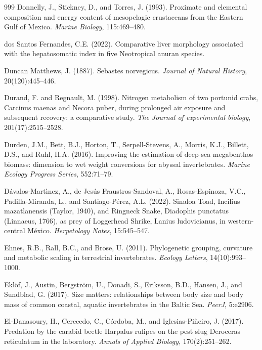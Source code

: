 \begin{thebibliography}{999}
Donnelly, J., Stickney, D., and Torres, J. (1993). Proximate and elemental composition and energy content of mesopelagic crustaceans from the Eastern Gulf of Mexico. \textit{Marine Biology}, 115:469--480.

dos Santos Fernandes, C.E. (2022). Comparative liver morphology associated with the hepatosomatic index in five Neotropical anuran species.

Duncan Matthews, J. (1887). Sebastes norvegicus. \textit{Journal of Natural History}, 20(120):445--446.

Durand, F. and Regnault, M. (1998). Nitrogen metabolism of two portunid crabs, Carcinus maenas and Necora puber, during prolonged air exposure and subsequent recovery: a comparative study. \textit{The Journal of experimental biology}, 201(17):2515--2528.

Durden, J.M., Bett, B.J., Horton, T., Serpell-Stevens, A., Morris, K.J., Billett, D.S., and Ruhl, H.A. (2016). Improving the estimation of deep-sea megabenthos biomass: dimension to wet weight conversions for abyssal invertebrates. \textit{Marine Ecology Progress Series}, 552:71--79.

D{\'a}valos-Mart{\'\i}nez, A., de Jes{\'u}s Fraustros-Sandoval, A., Rosas-Espinoza, V.C., Padilla-Miranda, L., and Santiago-P{\'e}rez, A.L. (2022). Sinaloa Toad, Incilius mazatlanensis (Taylor, 1940), and Ringneck Snake, Diadophis punctatus (Linnaeus, 1766), as prey of Loggerhead Shrike, Lanius ludovicianus, in western-central M{\'e}xico. \textit{Herpetology Notes}, 15:545--547.

Ehnes, R.B., Rall, B.C., and Brose, U. (2011). Phylogenetic grouping, curvature and metabolic scaling in terrestrial invertebrates. \textit{Ecology Letters}, 14(10):993--1000.

Ekl{\"o}f, J., Austin, Bergstr{\"o}m, U., Donadi, S., Eriksson, B.D., Hansen, J., and Sundblad, G. (2017). Size matters: relationships between body size and body mass of common coastal, aquatic invertebrates in the Baltic Sea. \textit{PeerJ}, 5:e2906.

El-Danasoury, H., Cerecedo, C., C{\'o}rdoba, M., and Iglesias-Pi{\~n}eiro, J. (2017). Predation by the carabid beetle Harpalus rufipes on the pest slug Deroceras reticulatum in the laboratory. \textit{Annals of Applied Biology}, 170(2):251--262.


\end{thebibliography}
